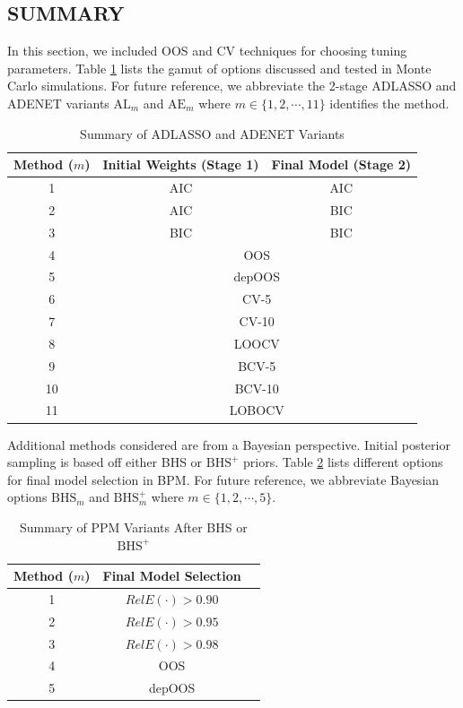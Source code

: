 \subsection{SUMMARY}

In this section, we included OOS and CV techniques for choosing tuning parameters. Table \ref{tab:aicbic} lists the gamut of options discussed and tested in Monte Carlo simulations. For future reference, we abbreviate the 2-stage ADLASSO and ADENET variants $\textrm{AL}_m$ and $\textrm{AE}_m$ where $m \in \{1,2,\cdots,11\}$ identifies the method. 

\begin{table}[!h]
  \footnotesize
  \centering
  \caption{Summary of ADLASSO and ADENET Variants}
    \begin{tabular}{c|cc}
    \toprule
    Method ($m$) & Initial Weights (Stage 1) & Final Model (Stage 2)  \\
    \midrule
    1 & AIC & AIC\\
    2 & AIC & BIC \\
    3 & BIC & BIC \\
    \midrule
    4 & \multicolumn{2}{c}{OOS} \\
    5 & \multicolumn{2}{c}{depOOS} \\
    \midrule
    6 & \multicolumn{2}{c}{CV-5} \\
    7 & \multicolumn{2}{c}{CV-10} \\
    8 & \multicolumn{2}{c}{LOOCV} \\
    \midrule
    9 & \multicolumn{2}{c}{BCV-5} \\
    10 & \multicolumn{2}{c}{BCV-10} \\
    11 & \multicolumn{2}{c}{LOBOCV} \\
    \bottomrule
    \end{tabular}%
  \label{tab:aicbic}%
\end{table}%

Additional methods considered are from a Bayesian perspective. Initial posterior sampling is based off either BHS or $\textrm{BHS}^+$ priors. Table \ref{tab:bhstypes} lists different options for final model selection in BPM. For future reference, we abbreviate Bayesian options $\textrm{BHS}_m$ and $\textrm{BHS}^+_m$ where $m \in \{1,2,\cdots,5\}$. 

\begin{table}[!h]
  \footnotesize
  \centering
  \caption{Summary of PPM Variants After BHS or $\textrm{BHS}^+$}
    \begin{tabular}{c|cc}
    \toprule
    Method ($m$) & Final Model Selection  \\
    \midrule
    1 & $RelE(\cdot)>0.90$ \\
    2 & $RelE(\cdot)>0.95$ \\
    3 & $RelE(\cdot)>0.98$\\
    \midrule
    4 & OOS\\
    5 & depOOS\\
    \bottomrule
    \end{tabular}%
  \label{tab:bhstypes}%
\end{table}%








